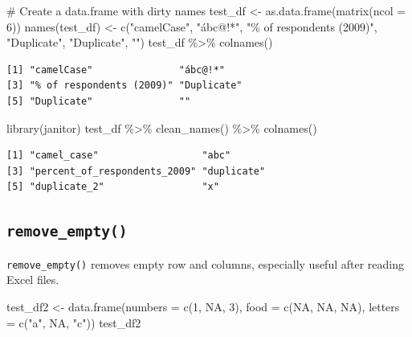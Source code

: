 \documentclass[
  letterpaper,
]{book}
\newenvironment{Shaded}{\begin{snugshade}}{\end{snugshade}}
\newcommand{\AttributeTok}[1]{\textcolor[rgb]{0.40,0.45,0.13}{#1}}
\newcommand{\CommentTok}[1]{\textcolor[rgb]{0.37,0.37,0.37}{#1}}
\newcommand{\ConstantTok}[1]{\textcolor[rgb]{0.56,0.35,0.01}{#1}}
\newcommand{\DecValTok}[1]{\textcolor[rgb]{0.68,0.00,0.00}{#1}}
\newcommand{\FunctionTok}[1]{\textcolor[rgb]{0.28,0.35,0.67}{#1}}
\newcommand{\NormalTok}[1]{\textcolor[rgb]{0.00,0.23,0.31}{#1}}
\newcommand{\OtherTok}[1]{\textcolor[rgb]{0.00,0.23,0.31}{#1}}
\newcommand{\SpecialCharTok}[1]{\textcolor[rgb]{0.37,0.37,0.37}{#1}}
\newcommand{\StringTok}[1]{\textcolor[rgb]{0.13,0.47,0.30}{#1}}
\begin{document}
\begin{Shaded}
\begin{Highlighting}[]
\CommentTok{\# Create a data.frame with dirty names}
\NormalTok{test\_df }\OtherTok{\textless{}{-}} \FunctionTok{as.data.frame}\NormalTok{(}\FunctionTok{matrix}\NormalTok{(}\AttributeTok{ncol =} \DecValTok{6}\NormalTok{))}
\FunctionTok{names}\NormalTok{(test\_df) }\OtherTok{\textless{}{-}} \FunctionTok{c}\NormalTok{(}\StringTok{"camelCase"}\NormalTok{, }\StringTok{"ábc@!*"}\NormalTok{, }\StringTok{"\% of respondents (2009)"}\NormalTok{,}
                    \StringTok{"Duplicate"}\NormalTok{, }\StringTok{"Duplicate"}\NormalTok{, }\StringTok{""}\NormalTok{)}
\NormalTok{test\_df }\SpecialCharTok{\%\textgreater{}\%} \FunctionTok{colnames}\NormalTok{()}
\end{Highlighting}
\end{Shaded}

\begin{verbatim}
[1] "camelCase"               "ábc@!*"                 
[3] "% of respondents (2009)" "Duplicate"              
[5] "Duplicate"               ""                       
\end{verbatim}

\begin{Shaded}
\begin{Highlighting}[]
\FunctionTok{library}\NormalTok{(janitor)}
\NormalTok{test\_df }\SpecialCharTok{\%\textgreater{}\%} \FunctionTok{clean\_names}\NormalTok{() }\SpecialCharTok{\%\textgreater{}\%} \FunctionTok{colnames}\NormalTok{()}
\end{Highlighting}
\end{Shaded}

\begin{verbatim}
[1] "camel_case"                  "abc"                        
[3] "percent_of_respondents_2009" "duplicate"                  
[5] "duplicate_2"                 "x"                          
\end{verbatim}

\hypertarget{remove_empty}{%
\subsection{\texorpdfstring{\texttt{remove\_empty()}}{remove\_empty()}}\label{remove_empty}}

\texttt{remove\_empty()} removes empty row and columns, especially
useful after reading Excel files.

\begin{Shaded}
\begin{Highlighting}[]
\NormalTok{test\_df2 }\OtherTok{\textless{}{-}} \FunctionTok{data.frame}\NormalTok{(}\AttributeTok{numbers =} \FunctionTok{c}\NormalTok{(}\DecValTok{1}\NormalTok{, }\ConstantTok{NA}\NormalTok{, }\DecValTok{3}\NormalTok{),}
                       \AttributeTok{food =} \FunctionTok{c}\NormalTok{(}\ConstantTok{NA}\NormalTok{, }\ConstantTok{NA}\NormalTok{, }\ConstantTok{NA}\NormalTok{),}
                       \AttributeTok{letters =} \FunctionTok{c}\NormalTok{(}\StringTok{"a"}\NormalTok{, }\ConstantTok{NA}\NormalTok{, }\StringTok{"c"}\NormalTok{))}
\NormalTok{test\_df2}
\end{Highlighting}
\end{Shaded}
\end{document}
